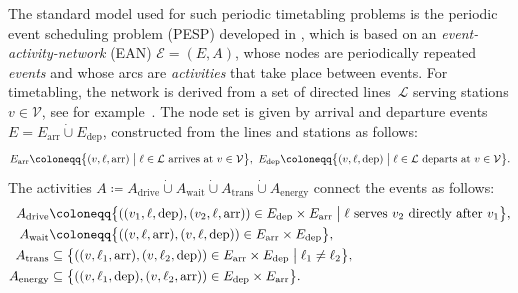 \documentclass[11pt,a4paper]{article}
\newcommand{\dotcup}{\mathbin{\dot\cup}}
\newcommand{\arr}{\mathrm{arr}}
\newcommand{\dep}{\mathrm{dep}}
\newcommand{\drive}{\mathrm{drive}}
\newcommand{\wait}{\mathrm{wait}}
\newcommand{\transfer}{\mathrm{trans}}
\newcommand{\energy}{\mathrm{energy}}
\newcommand{\possenergyact}{A_{\energy}} %
\newcommand{\pesp}{PESP\xspace}
\newcommand{\cL}{\mathcal{L}}
\newcommand{\cE}{\mathcal{E}}
\theoremstyle{definition}
\theoremstyle{remark}
\begin{document}
The standard model used for such periodic timetabling problems is the periodic event scheduling problem (\pesp) developed in \cite{Serafini1989}, which is based on an \emph{event-activity-network} (EAN) $\cE = (E, A)$, whose nodes are periodically repeated \emph{events} and whose arcs are \emph{activities} that take place between events. For timetabling, the network is derived from a set of directed lines~$\cL$ serving stations $v \in \mathcal{V}$, see for example~\cite{nac1996,odi1996}.  The node set is given by arrival and departure events $E = E_{\arr} \dotcup E_{\dep}$, constructed from the lines and stations as follows:
\[
E_{\arr} \coloneqq \bigl\{ (v, \ell, \arr) \bigm| \ell \in \cL\text{ arrives at }v \in \mathcal{V}\bigr\},\ 
E_{\dep} \coloneqq \bigl\{ (v, \ell, \dep) \bigm| \ell \in \cL\text{ departs at }v \in \mathcal{V}\bigr\}.
\]
The activities $A \coloneqq A_\drive \dotcup A_\wait \dotcup A_\transfer\dotcup \possenergyact$ connect the events as follows:
\begin{align*}
	A_\drive  &\coloneqq \bigl\{ ((v_1, \ell, \dep), (v_2, \ell , \arr)) \in E_\dep \times E_\arr \bigm| \ell \text{ serves }v_2 \text{ directly after } v_1\bigr\}, \\
	A_\wait  &\coloneqq \bigl\{ ((v, \ell, \arr), (v, \ell , \dep)) \in E_\arr \times E_\dep \bigr\}, \\
	A_\transfer &\subseteq \bigl\{ ((v, \ell_1, \arr), (v, \ell_2 , \dep)) \in E_\arr \times E_\dep \bigm| \ell_1 \neq \ell_2 \bigr\},\\
	\possenergyact &\subseteq \bigl\{ ((v, \ell_1, \dep), (v, \ell_2 , \arr)) \in E_{\dep} \times E_{\arr}\bigr\}.
\end{align*}
\end{document}
